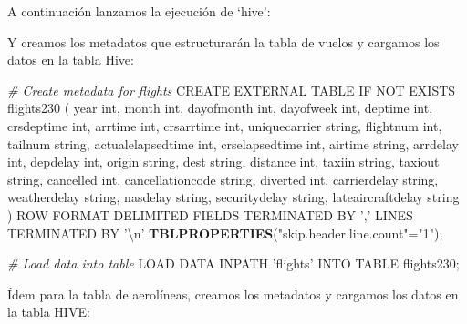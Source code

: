 \documentclass[]{book}
\newenvironment{Shaded}{\begin{snugshade}}{\end{snugshade}}
\newcommand{\KeywordTok}[1]{\textcolor[rgb]{0.13,0.29,0.53}{\textbf{#1}}}
\newcommand{\CharTok}[1]{\textcolor[rgb]{0.31,0.60,0.02}{#1}}
\newcommand{\StringTok}[1]{\textcolor[rgb]{0.31,0.60,0.02}{#1}}
\newcommand{\CommentTok}[1]{\textcolor[rgb]{0.56,0.35,0.01}{\textit{#1}}}
\newcommand{\OperatorTok}[1]{\textcolor[rgb]{0.81,0.36,0.00}{\textbf{#1}}}
\newcommand{\NormalTok}[1]{#1}
\begin{document}
A continuación lanzamos la ejecución de `hive':

\begin{Shaded}
\end{Shaded}

Y creamos los metadatos que estructurarán la tabla de vuelos y cargamos
los datos en la tabla Hive:

\begin{Shaded}
\begin{Highlighting}[]
\CommentTok{# Create metadata for flights}
\NormalTok{CREATE EXTERNAL TABLE IF NOT EXISTS flights230}
\NormalTok{(}
\NormalTok{year int,}
\NormalTok{month int,}
\NormalTok{dayofmonth int,}
\NormalTok{dayofweek int,}
\NormalTok{deptime int,}
\NormalTok{crsdeptime int,}
\NormalTok{arrtime int, }
\NormalTok{crsarrtime int,}
\NormalTok{uniquecarrier string,}
\NormalTok{flightnum int,}
\NormalTok{tailnum string, }
\NormalTok{actualelapsedtime int,}
\NormalTok{crselapsedtime int,}
\NormalTok{airtime string,}
\NormalTok{arrdelay int,}
\NormalTok{depdelay int, }
\NormalTok{origin string,}
\NormalTok{dest string,}
\NormalTok{distance int,}
\NormalTok{taxiin string,}
\NormalTok{taxiout string,}
\NormalTok{cancelled int,}
\NormalTok{cancellationcode string,}
\NormalTok{diverted int,}
\NormalTok{carrierdelay string,}
\NormalTok{weatherdelay string,}
\NormalTok{nasdelay string,}
\NormalTok{securitydelay string,}
\NormalTok{lateaircraftdelay string}
\NormalTok{)}
\NormalTok{ROW FORMAT DELIMITED}
\NormalTok{FIELDS TERMINATED BY }\StringTok{','}
\NormalTok{LINES TERMINATED BY }\StringTok{'}\CharTok{\textbackslash{}n}\StringTok{'}
\KeywordTok{TBLPROPERTIES}\NormalTok{(}\StringTok{"skip.header.line.count"}\NormalTok{=}\StringTok{"1"}\NormalTok{);}

\CommentTok{# Load data into table}
\NormalTok{LOAD DATA INPATH }\StringTok{'flights'}\NormalTok{ INTO TABLE flights230;}
\end{Highlighting}
\end{Shaded}

Ídem para la tabla de aerolíneas, creamos los metadatos y cargamos los
datos en la tabla HIVE:
\end{document}
